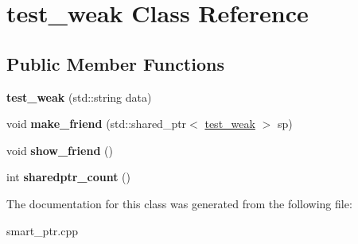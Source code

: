 \hypertarget{classtest__weak}{}\section{test\+\_\+weak Class Reference}
\label{classtest__weak}
\subsection*{Public Member Functions}
\begin{DoxyCompactItemize}
\item 
{\bfseries test\+\_\+weak} (std\+::string data)\hypertarget{classtest__weak_a49080e5eda45077620b490b2686b428e}{}\label{classtest__weak_a49080e5eda45077620b490b2686b428e}

\item 
void {\bfseries make\+\_\+friend} (std\+::shared\+\_\+ptr$<$ \hyperlink{classtest__weak}{test\+\_\+weak} $>$ sp)\hypertarget{classtest__weak_a13904b1a7b747b220a0479760ac2bcaa}{}\label{classtest__weak_a13904b1a7b747b220a0479760ac2bcaa}

\item 
void {\bfseries show\+\_\+friend} ()\hypertarget{classtest__weak_a5ecd92c16b2bf3667863dfdf30ea7ac0}{}\label{classtest__weak_a5ecd92c16b2bf3667863dfdf30ea7ac0}

\item 
int {\bfseries sharedptr\+\_\+count} ()\hypertarget{classtest__weak_a472f7fe1fa33045211d5e133df9f6c65}{}\label{classtest__weak_a472f7fe1fa33045211d5e133df9f6c65}

\end{DoxyCompactItemize}


The documentation for this class was generated from the following file\+:\begin{DoxyCompactItemize}
\item 
smart\+\_\+ptr.\+cpp\end{DoxyCompactItemize}
